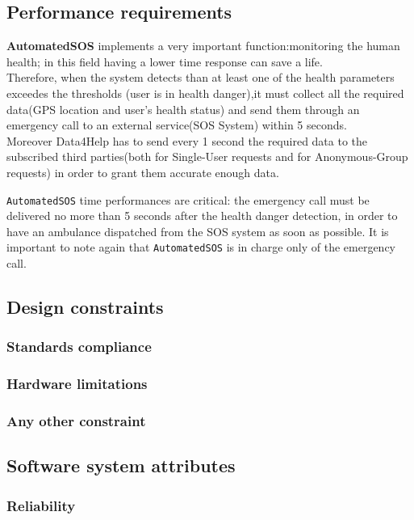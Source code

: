   \subsection{Performance requirements}
  \label{sec:performance}

    \textbf{AutomatedSOS} implements a very important function:monitoring the human health; in this field having a lower time response can save a life.\\
    Therefore, when the system detects than at least one of the health parameters exceedes the thresholds (user is in health danger),it must collect all the required data(GPS location and user's health status) and send them through an emergency call to an external service(SOS System) within 5 seconds.\\
    Moreover Data4Help has to send every 1 second the required data to the subscribed third parties(both for Single-User requests and for Anonymous-Group requests) in order to grant them accurate enough data.

    \texttt{AutomatedSOS} time performances are critical: the emergency call must be delivered no more than 5 seconds after the health danger detection, in order to have an ambulance dispatched from the SOS system as soon as possible. It is important to note again that \texttt{AutomatedSOS} is in charge only of the emergency call.

  \subsection{Design constraints}
    \subsubsection{Standards compliance}
    \subsubsection{Hardware limitations}
    \subsubsection{Any other constraint}
  \subsection{Software system attributes}

    \subsubsection{Reliability}

